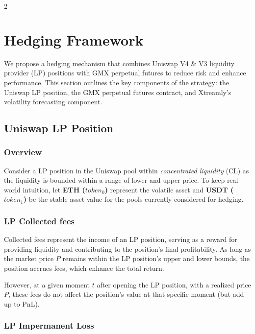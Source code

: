 \documentclass[10pt]{article}
\begin{document}
\begin{multicols}{2}

\section{Hedging Framework}
\label{sec:hedging}

We propose a hedging mechanism that combines Uniswap V4 \& V3 liquidity provider (LP) positions with GMX perpetual futures to reduce risk and enhance performance. This section outlines the key components of the strategy: the Uniswap LP position, the GMX perpetual futures contract, and Xtreamly’s volatility forecasting component.

\subsection{Uniswap LP Position}
\label{sec:uniswaplp}

\subsubsection{Overview}
Consider a LP position in the Uniswap pool within \textit{concentrated liquidity} (CL) as the liquidity is bounded within a range of lower and upper price. To keep real world intuition, let \textbf{ETH ($token_0$)} represent the volatile asset and \textbf{USDT ($token_1$)} be the stable  asset value for the pools currently considered for hedging.

\subsubsection{LP Collected fees}
Collected fees represent the income of an LP position, serving as a reward for providing liquidity and contributing to the position’s final profitability. As long as the market price $P$ remains within the LP position’s upper and lower bounds, the position accrues fees, which enhance the total return. 

\medskip

However, at a given moment $t$ after opening the LP position, with a realized price $P$, these fees do not affect the position’s value at that specific moment (but add up to PnL).

\subsubsection{LP Impermanent Loss}


\end{multicols}
\end{document}
